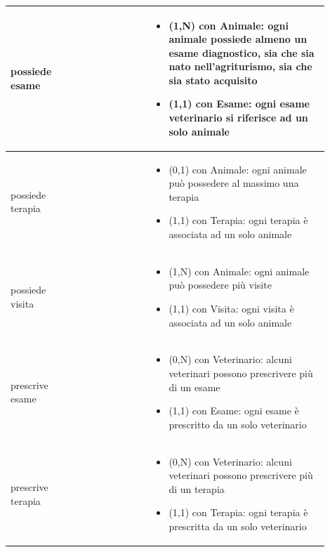 \documentclass[12pt,a4paper]{article}
\begin{document}
\begin{center}
\begin{longtable}{|p{0.16\linewidth}|p{0.24\linewidth}|p{0.50\linewidth}|}
\hline
possiede esame 				&   
					& \begin{itemize}
						\setlength{\itemindent}{-1em}
						\vspace{-25pt}
						\setlength\itemsep{-0.25em}
						\item (1,N) con Animale: ogni animale possiede almeno un esame diagnostico, sia che sia nato nell'agriturismo, sia che sia stato acquisito
						\item (1,1) con Esame: ogni esame veterinario si riferisce ad un solo animale
					\end{itemize}\\ 

\hline
possiede terapia 				&  
					& \begin{itemize}
						\setlength{\itemindent}{-1em}
						\vspace{-25pt}
						\setlength\itemsep{-0.25em}
						\item (0,1) con Animale: ogni animale può possedere al massimo una terapia
						\item (1,1) con Terapia: ogni terapia è associata ad un solo animale
					\end{itemize}\\ 

\hline
possiede visita					&  
					& \begin{itemize}
						\setlength{\itemindent}{-1em}
						\vspace{-25pt}
						\setlength\itemsep{-0.25em}
						\item (1,N) con Animale: ogni animale può possedere più visite
						\item (1,1) con Visita: ogni visita è associata ad un solo animale
					\end{itemize}\\ 

\hline
prescrive esame 				&   
					& \begin{itemize}
						\setlength{\itemindent}{-1em}
						\vspace{-25pt}
						\setlength\itemsep{-0.25em}
						\item (0,N) con Veterinario: alcuni veterinari possono prescrivere più di un esame
						\item (1,1) con Esame: ogni esame è prescritto da un solo veterinario
					\end{itemize}\\ 

\hline
prescrive terapia 				&   
					& \begin{itemize}
						\setlength{\itemindent}{-1em}
						\vspace{-25pt}
						\setlength\itemsep{-0.25em}
						\item (0,N) con Veterinario: alcuni veterinari possono prescrivere più di un terapia
						\item (1,1) con Terapia: ogni terapia è prescritta da un solo veterinario
					\end{itemize}\\ 


\end{longtable}
\end{center}
\end{document}
